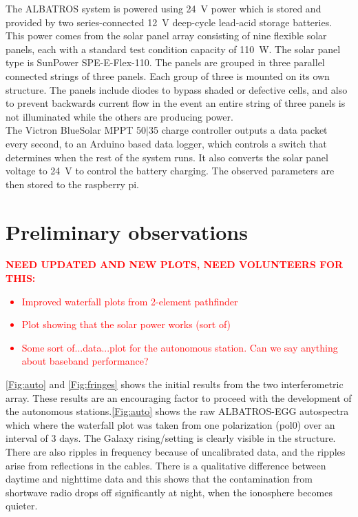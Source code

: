 \documentclass{ws-jai}
\begin{document}
The ALBATROS system is powered using \SI{24}{\volt} power which is stored and provided by two series-connected \SI{12}{\volt} deep-cycle lead-acid storage batteries. This power comes from the solar panel array consisting of nine flexible solar panels, each with a standard test condition capacity of \SI{110}{\watt}. The solar panel type is SunPower SPE-E-Flex-110. The panels are grouped in three parallel connected strings of three panels. Each group of three is mounted on its own structure. The panels include diodes to bypass shaded or defective cells, and also to prevent backwards current flow in the event an entire string of three panels is not illuminated while the others are producing power. \\

The Victron BlueSolar MPPT 50$\vert$35 charge controller outputs a data packet every second, to an Arduino based data logger, which controls a switch that determines when the rest of the system runs. It also converts the solar panel voltage to \SI{24}{\volt} to control the battery charging. The observed parameters are then stored to the raspberry pi.

\section{Preliminary observations}

\textcolor{red}{\bf NEED UPDATED AND NEW PLOTS, NEED VOLUNTEERS FOR THIS:
  \begin{itemize}
    \item{Improved waterfall plots from 2-element pathfinder}
    \item{Plot showing that the solar power works (sort of)}
    \item{Some sort of...data...plot for the autonomous station.  Can
      we say anything about baseband performance?}
  \end{itemize}
}
 
\autoref{Fig:auto} and \autoref{Fig:fringes} shows the initial results from the two interferometric array. These results are an encouraging factor to proceed with the development of the autonomous stations.\autoref{Fig:auto} shows the raw ALBATROS-EGG autospectra which where the waterfall plot was taken from one polarization (pol0) over an interval of 3 days. The Galaxy rising/setting is clearly visible in the structure. There are also ripples in frequency because of uncalibrated data, and the ripples arise from reflections in the cables. There is a qualitative difference between daytime and nighttime data and this shows that the contamination from shortwave radio drops off significantly at night, when the ionosphere becomes quieter.
\end{document}
